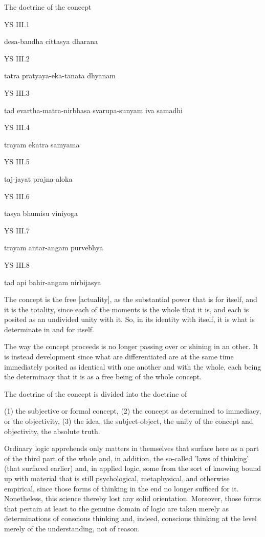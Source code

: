 
The doctrine of the concept

YS III.1

desa-bandha cittasya dharana

YS III.2

tatra pratyaya-eka-tanata dhyanam

YS III.3

tad evartha-matra-nirbhasa svarupa-sunyam iva samadhi

YS III.4

trayam ekatra samyama

YS III.5

taj-jayat prajna-aloka

YS III.6

tasya bhumisu viniyoga

YS III.7

trayam antar-angam purvebhya

YS III.8

tad api bahir-angam nirbijasya

The concept is the free [actuality],
as the substantial power that is for itself,
and it is the totality,
since each of the moments is the whole that it is,
and each is posited as an undivided unity with it.
So, in its identity with itself,
it is what is determinate in and for itself.

The way the concept proceeds is
no longer passing over or shining in an other.
It is instead development
since what are differentiated are
at the same time immediately posited as
identical with one another and with the whole,
each being the determinacy that it is
as a free being of the whole concept.

The doctrine of the concept is divided into the doctrine of

(1) the subjective or formal concept,
(2) the concept as determined to immediacy, or the objectivity,
(3) the idea, the subject-object,
the unity of the concept and objectivity,
the absolute truth.

Ordinary logic apprehends only matters in themselves that surface here
as a part of the third part of the whole and, in addition,
the so-called 'laws of thinking' (that surfaced earlier) and,
in applied logic, some from the sort of knowing bound up with material
that is still psychological, metaphysical, and otherwise empirical,
since those forms of thinking in the end no longer sufficed for it.
Nonetheless, this science thereby lost any solid orientation.
Moreover, those forms that pertain at least to the genuine domain of logic
are taken merely as determinations of conscious thinking and, indeed,
conscious thinking at the level merely of the understanding, not of reason.

